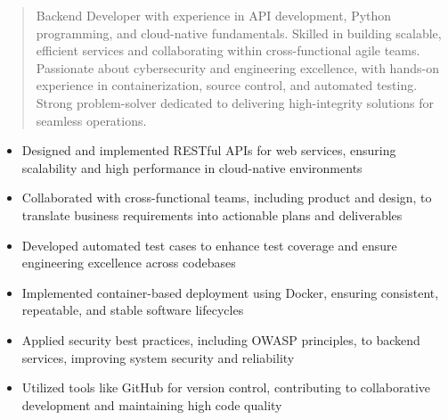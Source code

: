 



\makecvheader

\begin{quote}
  \noindent
  Backend Developer with experience in API development, Python programming, and cloud-native fundamentals. Skilled in building scalable, efficient services and collaborating within cross-functional agile teams. Passionate about cybersecurity and engineering excellence, with hands-on experience in containerization, source control, and automated testing. Strong problem-solver dedicated to delivering high-integrity solutions for seamless operations.
\end{quote}

\par\smallskip
\noindent
\begin{minipage}{20cm}
  \begin{minipage}{9.75cm}
    \begin{itemize}
      \item Designed and implemented RESTful APIs for web services, ensuring scalability and high performance in cloud-native environments
      \item Collaborated with cross-functional teams, including product and design, to translate business requirements into actionable plans and deliverables
      \item Developed automated test cases to enhance test coverage and ensure engineering excellence across codebases
    \end{itemize}
  \end{minipage}
  \hfill
  \begin{minipage}{9.75cm}
    \begin{itemize}
      \item Implemented container-based deployment using Docker, ensuring consistent, repeatable, and stable software lifecycles
      \item Applied security best practices, including OWASP principles, to backend services, improving system security and reliability
      \item Utilized tools like GitHub for version control, contributing to collaborative development and maintaining high code quality
    \end{itemize}
  \end{minipage}
\end{minipage}
\par\smallskip
\divider


